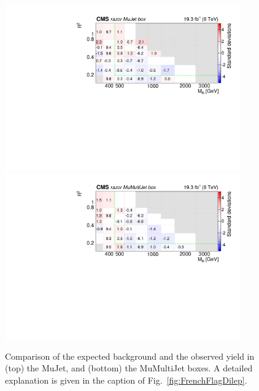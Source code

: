\begin{figure}[tb!]
\centering
\includegraphics[width=0.9\textwidth]{figs/analysis8TeV/nSigmaLog_MuJet.pdf}
\includegraphics[width=0.9\textwidth]{figs/analysis8TeV/nSigmaLog_MuMultiJet.pdf}
\caption{Comparison of the expected background and the observed yield
  in (top) the MuJet, and (bottom) the MuMultiJet boxes. A detailed explanation is given in the caption of
  Fig.~\ref{fig:FrenchFlagDilep}.\label{fig:FrenchFlagMu}}
\end{figure}

